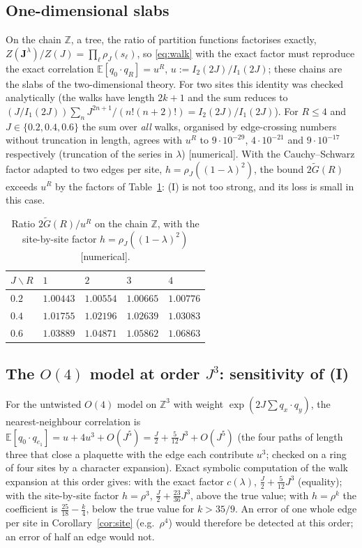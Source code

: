 \documentclass[11pt,a4paper]{article}
\theoremstyle{plain}
\theoremstyle{remark}
\numberwithin{equation}{section}
\newcommand{\Z}{\mathbb{Z}}
\newcommand{\E}{\mathbb{E}}
\newcommand{\Gt}{\widetilde G}
\newcommand{\st}[1]{\textsf{[#1]}}
\newcommand{\bs}{\boldsymbol}
\begin{document}
\subsection{One-dimensional slabs}
On the chain $\Z$, a tree, the ratio of partition functions factorises exactly, $Z(\bs J^\lambda)/Z(J)=\prod_\ell\rho_J(s_\ell)$, so
\eqref{eq:walk} with the exact factor must reproduce the exact correlation $\E[q_0\cdot q_R]=u^R$, $u:=I_2(2J)/I_1(2J)$; these chains
are the slabs of the two-dimensional theory. For two sites this identity was checked analytically (the walks have length $2k+1$ and
the sum reduces to $(J/I_1(2J))\sum_nJ^{2n+1}/(n!(n+2)!)=I_2(2J)/I_1(2J)$). For $R\le4$ and $J\in\{0.2,0.4,0.6\}$ the sum over
\emph{all} walks, organised by edge-crossing numbers without truncation in length, agrees with $u^R$ to $9\cdot10^{-29}$,
$4\cdot10^{-21}$ and $9\cdot10^{-17}$ respectively (truncation of the series in $\lambda$) \st{numerical}. With the Cauchy--Schwarz
factor adapted to two edges per site, $h=\rho_J((1-\lambda)^2)$, the bound $2\Gt(R)$ exceeds $u^R$ by the factors of
Table~\ref{tab:2d}: (I) is not too strong, and its loss is small in this case.

\begin{table}[ht]
\centering\small
\begin{tabular}{@{}lllll@{}}
\toprule
$J\backslash R$ & $1$ & $2$ & $3$ & $4$\\
\midrule
$0.2$ & $1.00443$ & $1.00554$ & $1.00665$ & $1.00776$\\
$0.4$ & $1.01755$ & $1.02196$ & $1.02639$ & $1.03083$\\
$0.6$ & $1.03889$ & $1.04871$ & $1.05862$ & $1.06863$\\
\bottomrule
\end{tabular}
\caption{Ratio $2\Gt(R)/u^R$ on the chain $\Z$, with the site-by-site factor $h=\rho_J((1-\lambda)^2)$ \st{numerical}.}
\label{tab:2d}
\end{table}

\subsection{The \texorpdfstring{$O(4)$}{O(4)} model at order \texorpdfstring{$J^3$}{J\^{}3}: sensitivity of (I)}
For the untwisted $O(4)$ model on $\Z^3$ with weight $\exp(2J\sum q_x\cdot q_y)$, the nearest-neighbour correlation is
$\E[q_0\cdot q_{e_1}]=u+4u^3+O(J^5)=\frac J2+\frac5{12}J^3+O(J^5)$ (the four paths of length three that close a plaquette with the
edge each contribute $u^3$; checked on a ring of four sites by a character expansion). Exact symbolic computation of the walk
expansion at this order gives: with the exact factor $c(\lambda)$, $\frac J2+\frac5{12}J^3$ (equality); with the site-by-site factor
$h=\rho^3$, $\frac J2+\frac{23}{36}J^3$, above the true value; with $h=\rho^k$ the coefficient is $\frac{25}{18}-\frac k4$, below the
true value for $k>35/9$. An error of one whole edge per site in Corollary~\ref{cor:site} (e.g.\ $\rho^4$) would therefore be detected
at this order; an error of half an edge would not.
\end{document}
